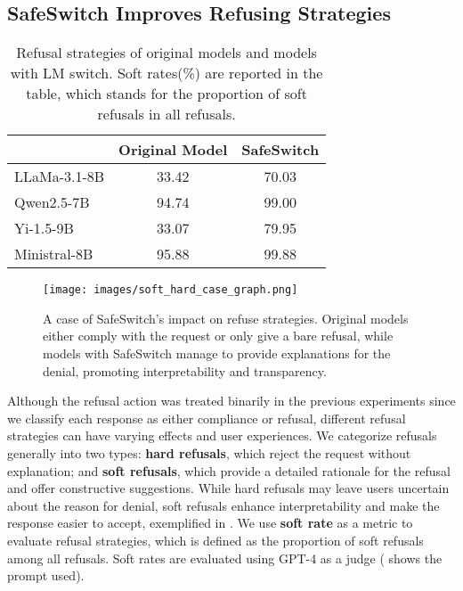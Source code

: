 \subsection{SafeSwitch Improves Refusing Strategies}
\label{result:refusal}

\begin{table}[]
\caption{Refusal strategies of original models and models with LM switch. Soft rates(\%) are reported in the table, which stands for the proportion of soft refusals in all refusals.}\label{table:refusal}
\vspace{2mm}
\centering
\renewcommand{\arraystretch}{1.1}
\fontsize{8.5pt}{9pt}\selectfont
\begin{tabular}{lcc}
\toprule
             & Original Model & SafeSwitch \\
\midrule
LLaMa-3.1-8B & 33.42          & 70.03      \\
Qwen2.5-7B   & 94.74          & 99.00      \\
Yi-1.5-9B    & 33.07          & 79.95      \\
Ministral-8B & 95.88          & 99.88     \\
\bottomrule
\end{tabular}
\end{table}


\begin{figure}[htbp]
    \centering
    \texttt{[image: images/soft\_hard\_case\_graph.png]}
    \caption{A case of SafeSwitch's impact on refuse strategies. Original models either comply with the request or only give a bare refusal, while models with SafeSwitch manage to provide explanations for the denial, promoting interpretability and transparency.}\label{fig:hard_soft}
\end{figure}


Although the refusal action was treated binarily in the previous experiments since we classify each response as either compliance or refusal, different refusal strategies can have varying effects and user experiences. We categorize refusals generally into two types: \textbf{hard refusals}, which reject the request without explanation; and \textbf{soft refusals}, which provide a detailed rationale for the refusal and offer constructive suggestions. While hard refusals may leave users uncertain about the reason for denial, soft refusals enhance interpretability and make the response easier to accept, exemplified in . We use \textbf{soft rate} as a metric to evaluate refusal strategies, which is defined as the proportion of soft refusals among all refusals. Soft rates are evaluated using GPT-4 as a judge ( shows the prompt used).

